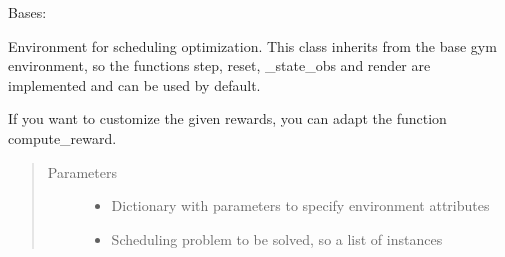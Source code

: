 \documentclass[letterpaper,10pt,english]{sphinxmanual}
\begin{document}
\begin{fulllineitems}
\label{\detokenize{environments:environments.env_tetris_scheduling.Env}}
\sphinxAtStartPar
Bases: 

\sphinxAtStartPar
Environment for scheduling optimization.
This class inherits from the base gym environment, so the functions step, reset, \_state\_obs and render
are implemented and can be used by default.

\sphinxAtStartPar
If you want to customize the given rewards, you can adapt the function compute\_reward.
\begin{quote}\begin{description}
\item[{Parameters}] \leavevmode\begin{itemize}
\item {} 
\sphinxAtStartPar
{} \textendash{} Dictionary with parameters to specify environment attributes

\item {} 
\sphinxAtStartPar
{} \textendash{} Scheduling problem to be solved, so a list of instances

\end{itemize}

\end{description}\end{quote}

\begin{fulllineitems}
\label{\detokenize{environments:environments.env_tetris_scheduling.Env.__init__}}
\end{fulllineitems}


\end{fulllineitems}
\end{document}

